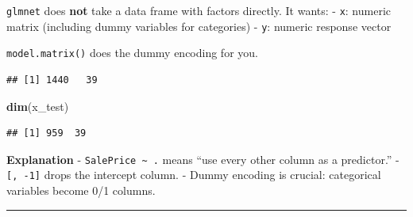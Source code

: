 \documentclass[
]{article}
\newenvironment{Shaded}{\begin{snugshade}}{\end{snugshade}}
\newcommand{\AttributeTok}[1]{\textcolor[rgb]{0.13,0.29,0.53}{#1}}
\newcommand{\CommentTok}[1]{\textcolor[rgb]{0.56,0.35,0.01}{\textit{#1}}}
\newcommand{\DecValTok}[1]{\textcolor[rgb]{0.00,0.00,0.81}{#1}}
\newcommand{\FunctionTok}[1]{\textcolor[rgb]{0.13,0.29,0.53}{\textbf{#1}}}
\newcommand{\NormalTok}[1]{#1}
\newcommand{\OtherTok}[1]{\textcolor[rgb]{0.56,0.35,0.01}{#1}}
\newcommand{\SpecialCharTok}[1]{\textcolor[rgb]{0.81,0.36,0.00}{\textbf{#1}}}
\begin{document}
\texttt{glmnet} does \textbf{not} take a data frame with factors
directly. It wants: - \texttt{x}: numeric matrix (including dummy
variables for categories) - \texttt{y}: numeric response vector

\texttt{model.matrix()} does the dummy encoding for you.

\begin{Shaded}
\end{Shaded}

\begin{verbatim}
## [1] 1440   39
\end{verbatim}

\begin{Shaded}
\begin{Highlighting}[]
\FunctionTok{dim}\NormalTok{(x\_test)}
\end{Highlighting}
\end{Shaded}

\begin{verbatim}
## [1] 959  39
\end{verbatim}

\textbf{Explanation} - \texttt{SalePrice\ \textasciitilde{}\ .} means
``use every other column as a predictor.'' - \texttt{{[},\ -1{]}} drops
the intercept column. - Dummy encoding is crucial: categorical variables
become 0/1 columns.

\begin{center}\rule{0.5\linewidth}{0.5pt}\end{center}
\end{document}

